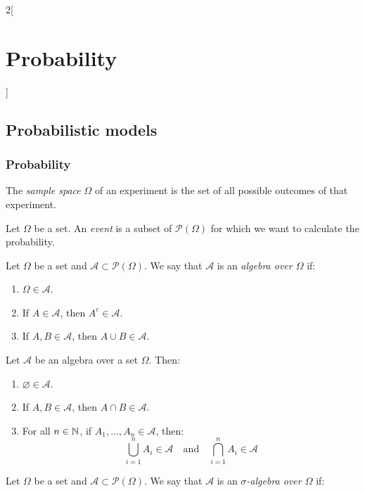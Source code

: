 \documentclass[../../../main.tex]{subfiles}
\begin{document}
\begin{multicols}{2}[\section{Probability}]
  \subsection{Probabilistic models}
  \subsubsection*{Probability}
  \begin{definition}
    The \textit{sample space} $\Omega$ of an experiment is the set of all possible outcomes of that experiment.
  \end{definition}
  \begin{definition}
    Let $\Omega$ be a set. An \textit{event} is a subset of $\mathcal{P}(\Omega)$ for which we want to calculate the probability.
  \end{definition}
  \begin{definition}
    Let $\Omega$ be a set and $\mathcal{A}\subset\mathcal{P}(\Omega)$. We say that $\mathcal{A}$ is an \textit{algebra over $\Omega$} if:
    \begin{enumerate}
      \item $\Omega\in\mathcal{A}$.
      \item If $A\in\mathcal{A}$, then $A^c\in\mathcal{A}$.
      \item If $A,B\in\mathcal{A}$, then $A\cup B\in\mathcal{A}$.
    \end{enumerate}
  \end{definition}
  \begin{prop}
    Let $\mathcal{A}$ be an algebra over a set $\Omega$. Then:
    \begin{enumerate}
      \item $\varnothing\in\mathcal{A}$.
      \item If $A,B\in\mathcal{A}$, then $A\cap B\in\mathcal{A}$.
      \item For all $n\in\mathbb{N}$, if $A_1,\ldots,A_n\in\mathcal{A}$, then: $$\bigcup_{i=1}^nA_i\in\mathcal{A}\quad\text{and}\quad\bigcap_{i=1}^nA_i\in\mathcal{A}$$
    \end{enumerate}
  \end{prop}
  \begin{definition}
    Let $\Omega$ be a set and $\mathcal{A}\subset\mathcal{P}(\Omega)$. We say that $\mathcal{A}$ is an \textit{$\sigma$-algebra over $\Omega$} if:

\end{definition}
\end{multicols}
\end{document}
